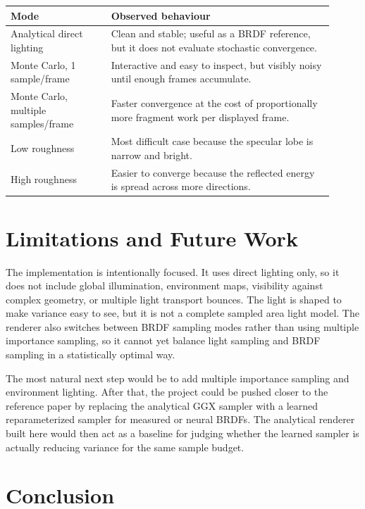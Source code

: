 \documentclass[12pt]{article}
\begin{document}
\begin{center}
\begin{tabular}{|p{0.29\linewidth}|p{0.62\linewidth}|}
\hline
\textbf{Mode} & \textbf{Observed behaviour} \\
\hline
Analytical direct lighting & Clean and stable; useful as a BRDF reference, but it does not evaluate stochastic convergence. \\
\hline
Monte Carlo, 1 sample/frame & Interactive and easy to inspect, but visibly noisy until enough frames accumulate. \\
\hline
Monte Carlo, multiple samples/frame & Faster convergence at the cost of proportionally more fragment work per displayed frame. \\
\hline
Low roughness & Most difficult case because the specular lobe is narrow and bright. \\
\hline
High roughness & Easier to converge because the reflected energy is spread across more directions. \\
\hline
\end{tabular}
\end{center}

\section{Limitations and Future Work}

The implementation is intentionally focused. It uses direct lighting only, so it does not include global illumination, environment maps, visibility against complex geometry, or multiple light transport bounces. The light is shaped to make variance easy to see, but it is not a complete sampled area light model. The renderer also switches between BRDF sampling modes rather than using multiple importance sampling, so it cannot yet balance light sampling and BRDF sampling in a statistically optimal way.

The most natural next step would be to add multiple importance sampling and environment lighting. After that, the project could be pushed closer to the reference paper by replacing the analytical GGX sampler with a learned reparameterized sampler for measured or neural BRDFs. The analytical renderer built here would then act as a baseline for judging whether the learned sampler is actually reducing variance for the same sample budget.

\section{Conclusion}
\end{document}
